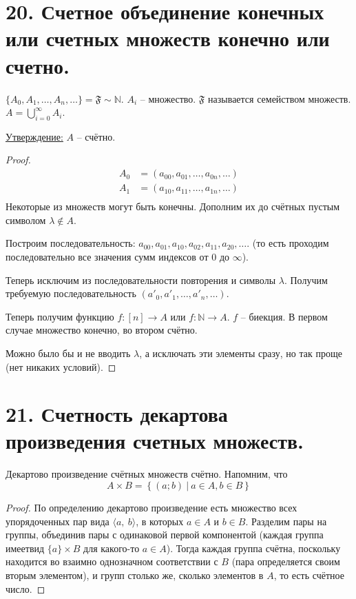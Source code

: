 \documentclass[a4paper, 12pt]{article}
\newcommand{\statement}{\underline{Утверждение:} }
\newcommand{\N}{\mathbb{N}}
\begin{document}
\section*{20. Счетное объединение конечных или счетных множеств конечно или счетно.}

        $\{A_0, A_1, \ldots, A_n, \ldots\} = \mathfrak{F} \sim \N$. $A_i$ -- множество.
        $\mathfrak{F}$ называется семейством множеств. 
        $A = \bigcup\limits_{i=0}^{\infty} A_i$.

        \statement $A$ -- счётно.
        \begin{proof}
        \begin{align*}
            A_0 &= (a_{00}, a_{01}, \ldots, a_{0n}, \ldots) \\
             A_1 &= (a_{10}, a_{11}, \ldots, a_{1n}, \ldots) \\
        \end{align*}
               Некоторые из множеств могут быть конечны. Дополним их до счётных
               пустым символом $\lambda \notin A$.

               Построим последовательность: $a_{00}, a_{01}, a_{10}, a_{02},
               a_{11}, a_{20}, \ldots$. (то есть проходим последовательно все значения
               сумм индексов от $0$ до $\infty$).

               Теперь исключим из последовательности повторения и символы $\lambda$.
               Получим требуемую последовательность $(a'_0, a'_1, \ldots, a'_n, \ldots)$.

               Теперь получим функцию $f: [n] \to A$ или $f: \N \to A$. $f$ -- биекция.
               В первом случае множество конечно, во втором счётно.

               Можно было бы и не вводить $\lambda$, а исключать эти элементы сразу,
               но так проще (нет никаких условий).
        \end{proof}


\section*{21. Счетность декартова произведения счетных множеств.}

\label{prop:CartProdAB}
          Декартово произведение счётных множеств счётно.
          Напомним, что \[A \times B = \left\{ (a; b)\ |\ a \in A, b \in B \right\}\]
          \begin{proof}
              По определению декартово произведение есть множество всех упорядоченных пар вида $\langle a,\ b\rangle$, в которых $a \in A$ и $b \in B$. Разделим пары на группы, объединив пары с одинаковой первой компонентой (каждая группа имеетвид $\{a\} \times B$ для какого-то $a \in A$). Тогда каждая группа счётна, поскольку находится во взаимно однозначном соответствии с $B$ (пара определяется своим вторым элементом), и групп столько же, сколько элементов в $A$, то есть счётное число.
          \end{proof}
\end{document}

